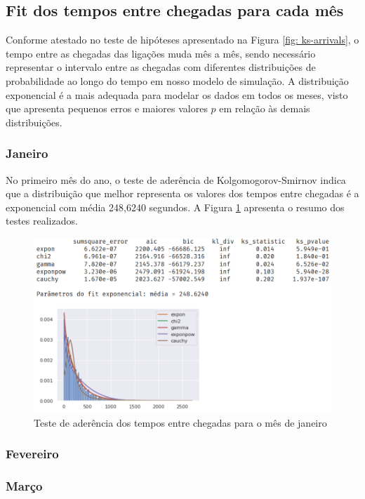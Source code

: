 \subsection{Fit dos tempos entre chegadas para cada mês} 
\label{section: fit-arrivals}
Conforme atestado no teste de hipóteses apresentado na Figura \ref*{fig: ks-arrivals}, o tempo entre as chegadas das ligações muda mês a mês, sendo necessário representar o intervalo entre as chegadas com diferentes distribuições de probabilidade ao longo do tempo em nosso modelo de simulação. A distribuição exponencial é a mais adequada para modelar os dados em todos os meses, visto que apresenta pequenos erros e maiores valores $p$ em relação às demais distribuições.

\subsubsection*{Janeiro}
No primeiro mês do ano, o teste de aderência de Kolgomogorov-Smirnov indica que a distribuição que melhor representa os valores dos tempos entre chegadas é a exponencial com média 248,6240 segundos. A Figura \ref*{fig: fit-janeiro} apresenta o resumo dos testes realizados.

\begin{figure}[H]
    \includegraphics[scale=0.8]{analise-de-dados/fit/fit-janeiro.png}
    \caption{Teste de aderência dos tempos entre chegadas para o mês de janeiro}
    \label{fig: fit-janeiro}
\end{figure}

\subsubsection*{Fevereiro}
\subsubsection*{Março}

